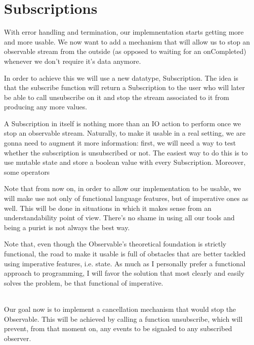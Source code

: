 \section{Subscriptions}

With error handling and termination, our implemnentation starts getting more and more usable. We now want to add a mechanism that will allow us to stop an observable stream from the outside (as opposed to waiting for an onCompleted) whenever we don't require it's data anymore. 

In order to achieve this we will use a new datatype, Subscription. The idea is that the subscribe function will return a Subscription to the user who will later be able to call unsubscribe on it and stop the stream associated to it from producing any more values.


A Subscription in itself is nothing more than an IO action to perform once we stop an observable stream. Naturally, to make it usable in a real setting, we are gonna need to augment it more information: first, we will need a way to test whether the subscription is unsubscribed or not. The easiest way to do this is to use mutable state and store a boolean value with every Subscription. Moreover, some operators 

Note that from now on, in order to allow our implementation to be usable, we will make use not only of functional language features, but of imperative ones as well. This will be done in situations in which it makes sense from an understandability point of view. There's no shame in using all our tools and being a purist is not always the best way.

Note that, even though the Observable's theoretical foundation is strictly functional, the road to make it usable is full of obstacles that are better tackled using imperative features, i.e. state. As much as I personally prefer a functional approach to programming, I will favor the solution that most clearly and easily solves the problem, be that functional of imperative.

\\

Our goal now is to implement a cancellation mechanism that would stop the Observable. This will be achieved by calling a function unsubscribe, which will prevent, from that moment on, any events to be signaled to any subscribed observer.

